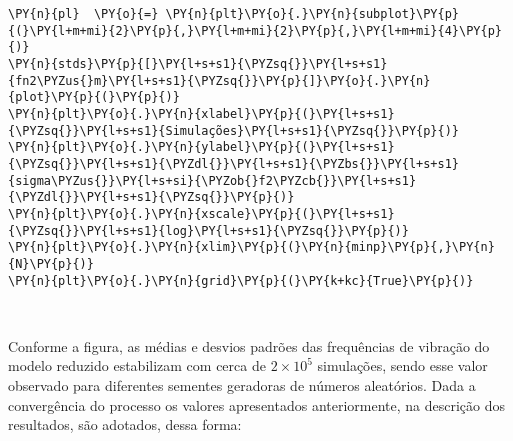 \begin{tcolorbox}[breakable, size=fbox, boxrule=1pt, pad at break*=1mm,colback=cellbackground, colframe=cellborder]
\begin{Verbatim}[commandchars=\\\{\}]
\PY{n}{pl}  \PY{o}{=} \PY{n}{plt}\PY{o}{.}\PY{n}{subplot}\PY{p}{(}\PY{l+m+mi}{2}\PY{p}{,}\PY{l+m+mi}{2}\PY{p}{,}\PY{l+m+mi}{4}\PY{p}{)}
\PY{n}{stds}\PY{p}{[}\PY{l+s+s1}{\PYZsq{}}\PY{l+s+s1}{fn2\PYZus{}m}\PY{l+s+s1}{\PYZsq{}}\PY{p}{]}\PY{o}{.}\PY{n}{plot}\PY{p}{(}\PY{p}{)}
\PY{n}{plt}\PY{o}{.}\PY{n}{xlabel}\PY{p}{(}\PY{l+s+s1}{\PYZsq{}}\PY{l+s+s1}{Simulações}\PY{l+s+s1}{\PYZsq{}}\PY{p}{)}
\PY{n}{plt}\PY{o}{.}\PY{n}{ylabel}\PY{p}{(}\PY{l+s+s1}{\PYZsq{}}\PY{l+s+s1}{\PYZdl{}}\PY{l+s+s1}{\PYZbs{}}\PY{l+s+s1}{sigma\PYZus{}}\PY{l+s+si}{\PYZob{}f2\PYZcb{}}\PY{l+s+s1}{\PYZdl{}}\PY{l+s+s1}{\PYZsq{}}\PY{p}{)}
\PY{n}{plt}\PY{o}{.}\PY{n}{xscale}\PY{p}{(}\PY{l+s+s1}{\PYZsq{}}\PY{l+s+s1}{log}\PY{l+s+s1}{\PYZsq{}}\PY{p}{)}
\PY{n}{plt}\PY{o}{.}\PY{n}{xlim}\PY{p}{(}\PY{n}{minp}\PY{p}{,}\PY{n}{N}\PY{p}{)}
\PY{n}{plt}\PY{o}{.}\PY{n}{grid}\PY{p}{(}\PY{k+kc}{True}\PY{p}{)}
\end{Verbatim}
\end{tcolorbox}

    \begin{center}
    \end{center}
    { \hspace*{\fill} \\}
    
    Conforme a figura, as médias e desvios padrões das frequências de
vibração do modelo reduzido estabilizam com cerca de \(2\times 10^5\)
simulações, sendo esse valor observado para diferentes sementes
geradoras de números aleatórios. Dada a convergência do processo os
valores apresentados anteriormente, na descrição dos resultados, são
adotados, dessa forma:

